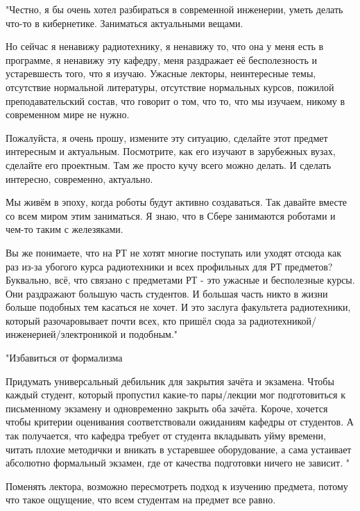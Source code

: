         \begin{commentbox}
			"Честно, я бы очень хотел разбираться в современной инженерии, уметь делать что-то в кибернетике. Заниматься актуальными вещами.

            Но сейчас я ненавижу радиотехнику, я ненавижу то, что она у меня есть в программе, я ненавижу эту кафедру, меня раздражает её бесполезность и устаревшесть того, что я изучаю. Ужасные лекторы, неинтересные темы, отсутствие нормальной литературы, отсутствие нормальных курсов, пожилой преподавательский состав, что говорит о том, что то, что мы изучаем, никому в современном мире не нужно. 

            Пожалуйста, я очень прошу, измените эту ситуацию, сделайте этот предмет интересным и актуальным.  Посмотрите, как его изучают в зарубежных вузах, сделайте его проектным. Там же просто кучу всего можно делать. И сделать интересно, современно, актуально.

            Мы живём в эпоху, когда роботы будут активно создаваться. Так давайте вместе со всем миром этим заниматься. Я знаю, что в Сбере занимаются роботами и чем-то таким с железяками. 

            Вы же понимаете, что на РТ не хотят многие поступать или уходят отсюда как раз из-за убогого курса радиотехники и всех профильных для РТ предметов? Буквально, всё, что связано с предметами РТ - это ужасные и бесполезные курсы. Они раздражают большую часть студентов. И большая часть никто в жизни больше подобных тем касаться не хочет. И это заслуга факультета радиотехники, который разочаровывает почти всех, кто пришёл сюда за радиотехникой/инженерией/электроникой и подобным."
		\end{commentbox}

        \begin{commentbox}
			"Избавиться от формализма

            Придумать универсальный дебильник для закрытия зачёта и экзамена. Чтобы каждый студент, который пропустил какие-то пары/лекции мог подготовиться к письменному экзамену и одновременно закрыть оба зачёта. 
            Короче, хочется чтобы критерии оценивания соответствовали ожиданиям кафедры от студентов. А так получается, что кафедра требует от студента вкладывать уйму времени, читать плохие методички и вникать в устаревшее оборудование, а сама устаивает абсолютно формальный экзамен, где от качества подготовки ничего не зависит. "
		\end{commentbox}

        \begin{commentbox}
			Поменять лектора, возможно пересмотреть подход к изучению предмета, потому что такое ощущение, что всем студентам на предмет все равно. 
		\end{commentbox}

